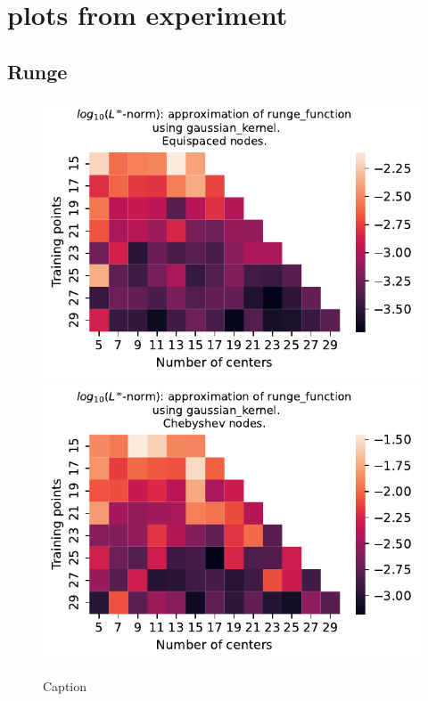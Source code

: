 \documentclass[12pt]{report} %
\begin{document}
\section*{plots from experiment}

\subsection*{Runge}

\begin{figure}[ht]
    \centering
    
    \includegraphics[width=.49\textwidth]{imagenes/experiments/1d/variational/runge_function-Kgaussian_kernel-Equi.pdf}
    \includegraphics[width=.49\textwidth]{imagenes/experiments/1d/variational/runge_function-Kgaussian_kernel-Cheb.pdf}
    \caption{Caption}
    \label{fig:runge-gaussian}
\end{figure}
\end{document}
